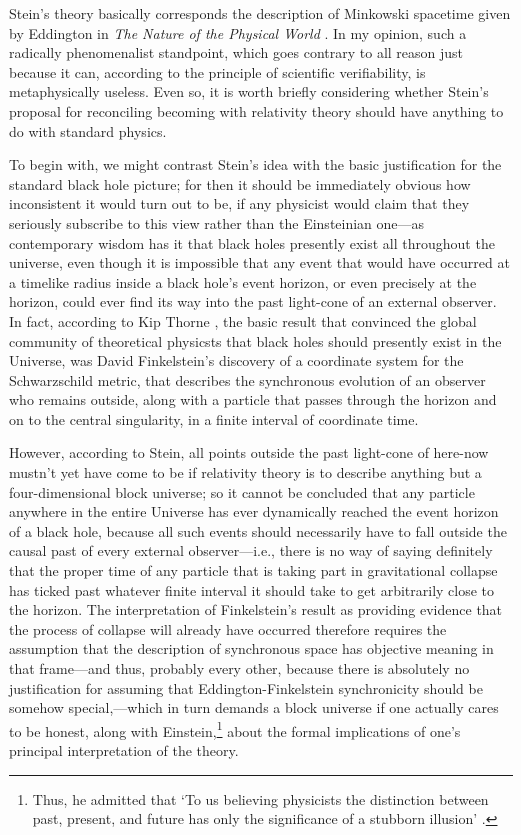 Stein's theory basically corresponds the description of Minkowski spacetime given by Eddington in \textit{The Nature of the Physical World} \cite{Eddington1929}. In my opinion, such a radically phenomenalist standpoint, which goes contrary to all reason just because it can, according to the principle of scientific verifiability, is metaphysically useless. Even so, it is worth briefly considering whether Stein's proposal for reconciling becoming with relativity theory should have anything to do with standard physics.

To begin with, we might contrast Stein's idea with the basic justification for the standard black hole picture; for then it should be immediately obvious how inconsistent it would turn out to be, if any physicist would claim that they seriously subscribe to this view rather than the Einsteinian one---as contemporary wisdom has it that black holes presently exist all throughout the universe, even though it is impossible that any event that would have occurred at a timelike radius inside a black hole's event horizon, or even precisely at the horizon, could ever find its way into the past light-cone of an external observer. In fact, according to Kip Thorne \cite{Thorne1994}, the basic result that convinced the global community of theoretical physicsts that black holes should presently exist in the Universe, was David Finkelstein's  \cite{Finkelstein1958} discovery of a coordinate system for the Schwarzschild metric, that describes the synchronous evolution of an observer who remains outside, along with a particle that passes through the horizon and on to the central singularity, in a finite interval of coordinate time. 

However, according to Stein, all points outside the past light-cone of here-now mustn't yet have come to be if relativity theory is to describe anything but a four-dimensional block universe; so it cannot be concluded that any particle anywhere in the entire Universe has ever dynamically reached the event horizon of a black hole, because all such events should necessarily have to fall outside the causal past of every external observer---i.e., there is no way of saying definitely that the proper time of any particle that is taking part in gravitational collapse has ticked past whatever finite interval it should take to get arbitrarily close to the horizon. The interpretation of Finkelstein's result as providing evidence that the process of collapse will already have occurred therefore requires the assumption that the description of synchronous space has objective meaning in that frame---and thus, probably every other, because there is absolutely no justification for assuming that Eddington-Finkelstein synchronicity should be somehow special,---which in turn demands a block universe if one actually cares to be honest, along with Einstein,\footnote{Thus, he admitted that `To us believing physicists the distinction between past, present, and future has only the significance of a stubborn illusion' \cite{Foelsing1997}.} about the formal implications of one's principal interpretation of the theory. 

